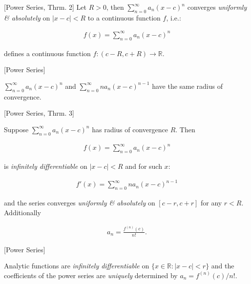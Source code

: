 \documentclass[10pt]{article} %
\begin{document}
\begin{multicols}{3}
\begin{theorem}{[Power Series, Thrm. 2]}{}
    Let $R > 0$, then $\sum_{n=0}^{\infty} a_n (x - c)^n$ converges \emph{uniformly \& absolutely} on $|x - c| < R$ to a continuous function $f$, i.e.:

        \begin{align*}
            f(x) = \sum_{n=0}^{\infty} a_n (x - c)^n
        \end{align*}

    defines a continuous function $f: (c - R, c + R) \to \mathbb{R}$.

\end{theorem}

\begin{lemma}{[Power Series]}{}

    $\sum_{n=0}^{\infty} a_n (x - c)^n$ and $\sum_{n=0}^{\infty} n a_n (x - c)^{n-1}$ have the same radius of convergence.

\end{lemma}

\begin{theorem}{[Power Series, Thrm. 3]}{}

    Suppose $\sum_{n=0}^{\infty} a_n (x - c)^n$ has radius of convergence $R$. Then

        \begin{align*}
            f(x) = \sum_{n=0}^{\infty} a_n (x - c)^n
        \end{align*}

    is \emph{infinitely differentiable} on $|x - c| < R$ and for such $x$:

        \begin{align*}
            f'(x) = \sum_{n=0}^{\infty} na_n (x - c)^{n-1}
        \end{align*}

    and the series converges \emph{uniformly \& absolutely} on $[c - r, c + r]$ for any $r < R$. Additionally

        \begin{align*}
            a_n = \frac{f^{(n)}(c)}{n!}.
        \end{align*}

\end{theorem}

\begin{remark}{[Power Series]}{}

    Analytic functions are \emph{infinitely differentiable} on $\{x \in \mathbb{R}: |x - c| < r\}$ and the coefficients of the power series are \emph{uniquely} determined by $a_n = f^{(n)}(c)/n!$.


\end{remark}
\end{multicols}
\end{document}
